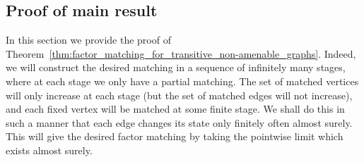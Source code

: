 \documentclass[11pt, reqno]{article}
\numberwithin{equation}{section}
\theoremstyle{definition}
\newcommand{\1}{\mathds{1}}
\begin{document}
\subsection{Proof of main result}

In this section we provide the proof of Theorem~\ref{thm:factor_matching_for_transitive_non-amenable_graphs}. Indeed, we will construct the desired matching in a sequence of infinitely many stages, where at each stage we only have a partial matching. The set of matched vertices will only increase at each stage (but the set of matched edges will not increase), and each fixed vertex will be matched at some finite stage. We shall do this in such a manner that each edge changes its state only finitely often almost surely. This will give the desired factor matching by taking the pointwise limit which exists almost surely.
\end{document}
